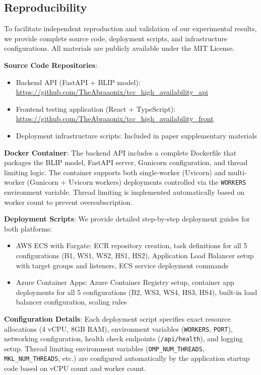 \subsection{Reproducibility}

To facilitate independent reproduction and validation of our experimental results, we provide complete source code, deployment scripts, and infrastructure configurations. All materials are publicly available under the MIT License.

\textbf{Source Code Repositories}:
\begin{itemize}
\item Backend API (FastAPI + BLIP model): \url{https://github.com/TheAbraaonix/tcc_high_availability_api}
\item Frontend testing application (React + TypeScript): \url{https://github.com/TheAbraaonix/tcc_high_availability_front}
\item Deployment infrastructure scripts: Included in paper supplementary materials
\end{itemize}

\textbf{Docker Container}: The backend API includes a complete Dockerfile that packages the BLIP model, FastAPI server, Gunicorn configuration, and thread limiting logic. The container supports both single-worker (Uvicorn) and multi-worker (Gunicorn + Uvicorn workers) deployments controlled via the \texttt{WORKERS} environment variable. Thread limiting is implemented automatically based on worker count to prevent oversubscription.

\textbf{Deployment Scripts}: We provide detailed step-by-step deployment guides for both platforms:
\begin{itemize}
\item AWS ECS with Fargate: ECR repository creation, task definitions for all 5 configurations (B1, WS1, WS2, HS1, HS2), Application Load Balancer setup with target groups and listeners, ECS service deployment commands
\item Azure Container Apps: Azure Container Registry setup, container app deployments for all 5 configurations (B2, WS3, WS4, HS3, HS4), built-in load balancer configuration, scaling rules
\end{itemize}

\textbf{Configuration Details}: Each deployment script specifies exact resource allocations (4 vCPU, 8GB RAM), environment variables (\texttt{WORKERS}, \texttt{PORT}), networking configuration, health check endpoints (\texttt{/api/health}), and logging setup. Thread limiting environment variables (\texttt{OMP\_NUM\_THREADS}, \texttt{MKL\_NUM\_THREADS}, etc.) are configured automatically by the application startup code based on vCPU count and worker count.

